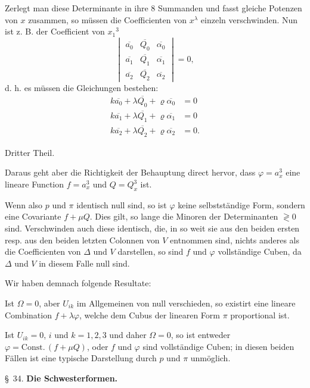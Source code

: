 \documentclass[11pt]{article}
\providecommand{\weberpage}[1]{}
\let\Delta\varDelta
\let\Omega\varOmega
\begin{document}
Zerlegt man diese Determinante in ihre 8 Summanden und fasst gleiche Potenzen von $x$ zusammen, so müssen die Coefficienten von $x^\lambda$ einzeln verschwinden. Nun ist z. B. der Coefficient von $x_1{}^3$
\[
\begin{vmatrix}
\overline{a_0} & \overline{Q_0} & \overline{\alpha_0} \\
\overline{a_1} & \overline{Q_1} & \overline{\alpha_1} \\
\overline{a_2} & \overline{Q_2} & \overline{\alpha_2}
\end{vmatrix} = 0,
\]
d. h. es müssen die Gleichungen bestehen:
\[
\begin{aligned}
k\overline{a_0} + \lambda \overline{Q_0} + \varrho\overline{\alpha_0} &= 0 \\
k\overline{a_1} + \lambda \overline{Q_1} + \varrho\overline{\alpha_1} &= 0 \\
k\overline{a_2} + \lambda \overline{Q_2} + \varrho\overline{\alpha_2} &= 0.
\end{aligned}
\]


\weberpage{354}
Dritter Theil.

Daraus geht aber die Richtigkeit der Behauptung direct hervor, dass $\varphi = a_x^3$ eine lineare Function $f = a_x^3$ und $Q = Q_x^3$ ist.

Wenn also $p$ und $\pi$ identisch null sind, so ist $\varphi$ keine selbstständige Form, sondern eine Covariante $f + \mu Q$. Dies gilt, so lange die Minoren der Determinanten $\gtrless 0$ sind. Verschwinden auch diese identisch, die, in so weit sie aus den beiden ersten resp. aus den beiden letzten Colonnen von $V$ entnommen sind, nichts anderes als die Coefficienten von $\Delta$ und $V$ darstellen, so sind $f$ und $\varphi$ vollständige Cuben, da $\Delta$ und $V$ in diesem Falle null sind.

Wir haben demnach folgende Resultate:

\glqq Ist $\Omega = 0$, aber $U_{ik}$ im Allgemeinen von null verschieden, so existirt eine lineare Combination $f + \lambda\varphi$, welche dem Cubus der linearen Form $\pi$ proportional ist.\grqq{}

\glqq Ist $U_{ik} = 0$, $i$ und $k = 1, 2, 3$ und daher $\Omega = 0$, so ist entweder $\varphi = \mathrm{Const.}\,(f + \mu Q)$, oder $f$ und $\varphi$ sind vollständige Cuben; in diesen beiden Fällen ist eine typische Darstellung durch $p$ und $\pi$ unmöglich.\grqq{}

\bigskip
\centerline{\S\ 34. \textbf{Die Schwesterformen.}}
\bigskip
\end{document}

